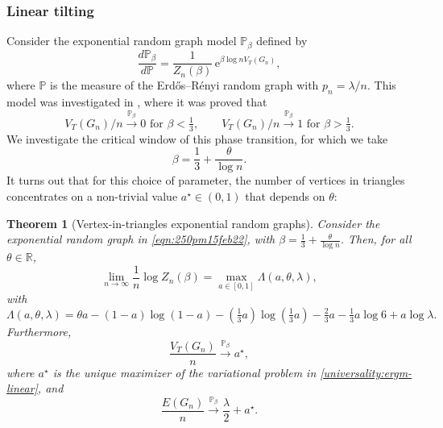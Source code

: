 \documentclass[bj,authoryear,noshowframe]{imsart}
\numberwithin{equation}{section}
\theoremstyle{plain}
\newtheorem{thm}{Theorem}[section]
\theoremstyle{definition}
\newcommand{\eqn}[1]{\begin{equation}#1\end{equation}}
\newcommand{\sss}{\scriptscriptstyle}
\newcommand{\erdos}{Erd\H{o}s--R\'enyi random graph}
\newcommand {\convpbeta}{\stackrel{\sss {\mathbb P}_{\beta}}{\longrightarrow}}
\begin{document}
\subsubsection{Linear tilting}

Consider the exponential random graph model $\mathbb{P}_\beta$ defined by 
	\begin{equation}
	\label{eqn:250pm15feb22}
	\frac{d\mathbb{P}_\beta}{d\mathbb{P}} = \frac{1}{Z_n(\beta)}\, \mathrm{e}^{\beta \log{n} V_{T}(G_n)},
	\end{equation}
where $\mathbb{P}$ is the measure of the \erdos{} with $p_n=\lambda/n$. This model was investigated in \cite{ChaHofHol21}, where it was proved that 
$$
V_T(G_n)/n\convpbeta 0 \text{ for } \beta<\tfrac{1}{3}, \qquad
V_T(G_n)/n\convpbeta 1 \text{ for } \beta>\tfrac{1}{3}.
$$ 
We investigate the critical window of this phase transition, for which we take
	\eqn{
	\label{beta-choice-linear}
	\beta=\frac{1}{3}+\frac{\theta}{\log n}.
	}
It turns out that for this choice of parameter, the number of vertices in triangles concentrates on a non-trivial value $a^\star \in (0,1)$ that depends on $\theta$:

\begin{thm}[Vertex-in-triangles exponential random graphs]
\label{thm-linear-tilting-ERG}
Consider the exponential random graph in \eqref{eqn:250pm15feb22}, with $\beta=\tfrac13+\frac{\theta}{\log n}$. Then, for all $\theta\in {\mathbb R}$,
	\begin{equation}
	\label{universality:ergm-linear}
	\lim_{n\rightarrow \infty} \frac{1}{n}\log{Z_n(\beta)} = \max_{a\in[0,1]} \Lambda(a,\theta,\lambda),
	\end{equation}
with 
	\begin{equation}
	\Lambda(a,\theta,\lambda) = \theta a - (1-a) \log(1-a) - (\tfrac13 a) \log(\tfrac13 a)
	-\tfrac23 a -\tfrac13 a \log{6} + a\log{\lambda}.
	\end{equation}
Furthermore,
	\begin{equation}
	\label{eqn:wed20303pm}
	\frac{V_T(G_n)}{n}\convpbeta a^\star,
	\end{equation}
where $a^\star$ is the unique maximizer of the variational problem in \eqref{universality:ergm-linear}, and
	\begin{equation}
	\label{eqn:wed20304pm}
	\frac{E(G_n)}{n}\convpbeta \frac{\lambda}{2}+a^\star.
	\end{equation}
\end{thm}
\end{document}
